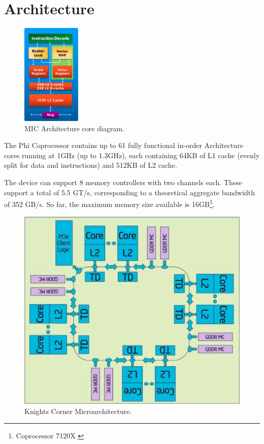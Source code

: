 \documentclass[../thesis]{subfiles}
\begin{document}
	\section{Architecture}
	\label{sec:mic:arch}

	\begin{figure}
		\centering
		\includegraphics[width=0.25\textwidth]{assets/images/mic/arch/core.png}
		\captionsetup{font=small}
		\caption{\intel MIC Architecture core diagram.}
		\label{fig:mic:core}
	\end{figure}

	The \intel\xeon Phi Coprocessor contains up to 61 fully functional in-order \intel\mic Architecture cores running at 1GHz (up to 1.3GHz), each containing 64KB of L1 cache (evenly split for data and instructions) and 512KB of L2 cache.

	The device can support 8 memory controllers with two  channels each. These support a total of 5.5 GT/s, corresponding to a theoretical aggregate bandwidth of 352 GB/s. So far, the maximum memory size available is 16GB\footnote{\intel\xeonphi Coprocessor 7120X \cite{intel:datasheet:xeonphi}}.

	\begin{figure}[t]
		\centering
		\includegraphics[height=0.3\textheight]{assets/images/mic/arch/microarch.png}
		\caption{Knights Corner Microarchitecture.}
	\end{figure}
\end{document}
